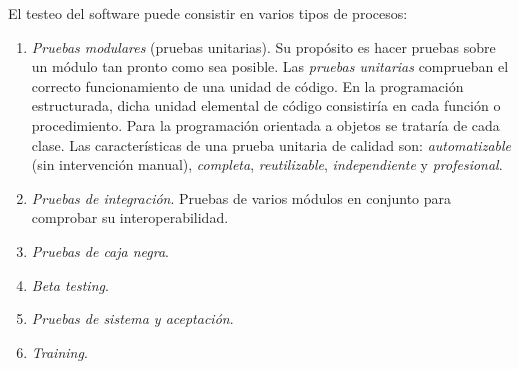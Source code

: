 El testeo del software puede consistir en varios tipos de procesos:
\begin{enumerate}[noitemsep]
\item \emph{Pruebas modulares} (pruebas unitarias). Su propósito es hacer pruebas sobre un módulo tan pronto como sea posible. Las \emph{pruebas unitarias} comprueban el correcto funcionamiento de una unidad de código. En la programación estructurada, dicha unidad elemental de código consistiría en cada función o procedimiento. Para la programación orientada a objetos se trataría de cada clase. Las características de una prueba unitaria de calidad son: \emph{automatizable} (sin intervención manual), \emph{completa},  \emph{reutilizable}, \emph{independiente} y \emph{profesional}.

\item \emph{Pruebas de integración}. Pruebas de varios módulos en conjunto para comprobar su interoperabilidad.

\item \emph{Pruebas de caja negra}.

\item \emph{Beta testing}.

\item \emph{Pruebas de sistema y aceptación}.

\item \emph{Training}.
\end{enumerate}



